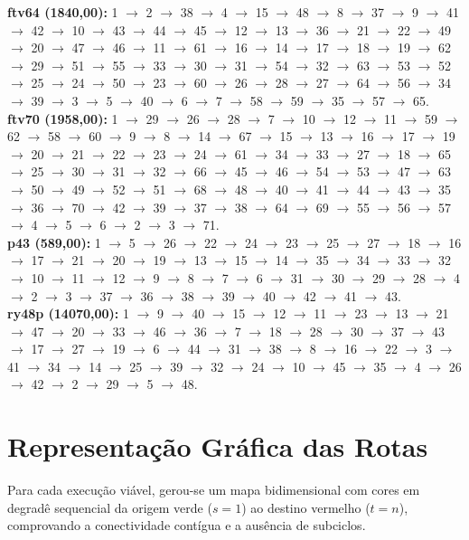 \documentclass[10pt,a4paper]{article}
\begin{document}
\textbf{ftv64 (1840,00):} 1 $\to$ 2 $\to$ 38 $\to$ 4 $\to$ 15 $\to$ 48 $\to$ 8 $\to$ 37 $\to$ 9 $\to$ 41 $\to$ 42 $\to$ 10 $\to$ 43 $\to$ 44 $\to$ 45 $\to$ 12 $\to$ 13 $\to$ 36 $\to$ 21 $\to$ 22 $\to$ 49 $\to$ 20 $\to$ 47 $\to$ 46 $\to$ 11 $\to$ 61 $\to$ 16 $\to$ 14 $\to$ 17 $\to$ 18 $\to$ 19 $\to$ 62 $\to$ 29 $\to$ 51 $\to$ 55 $\to$ 33 $\to$ 30 $\to$ 31 $\to$ 54 $\to$ 32 $\to$ 63 $\to$ 53 $\to$ 52 $\to$ 25 $\to$ 24 $\to$ 50 $\to$ 23 $\to$ 60 $\to$ 26 $\to$ 28 $\to$ 27 $\to$ 64 $\to$ 56 $\to$ 34 $\to$ 39 $\to$ 3 $\to$ 5 $\to$ 40 $\to$ 6 $\to$ 7 $\to$ 58 $\to$ 59 $\to$ 35 $\to$ 57 $\to$ 65. \\
\textbf{ftv70 (1958,00):} 1 $\to$ 29 $\to$ 26 $\to$ 28 $\to$ 7 $\to$ 10 $\to$ 12 $\to$ 11 $\to$ 59 $\to$ 62 $\to$ 58 $\to$ 60 $\to$ 9 $\to$ 8 $\to$ 14 $\to$ 67 $\to$ 15 $\to$ 13 $\to$ 16 $\to$ 17 $\to$ 19 $\to$ 20 $\to$ 21 $\to$ 22 $\to$ 23 $\to$ 24 $\to$ 61 $\to$ 34 $\to$ 33 $\to$ 27 $\to$ 18 $\to$ 65 $\to$ 25 $\to$ 30 $\to$ 31 $\to$ 32 $\to$ 66 $\to$ 45 $\to$ 46 $\to$ 54 $\to$ 53 $\to$ 47 $\to$ 63 $\to$ 50 $\to$ 49 $\to$ 52 $\to$ 51 $\to$ 68 $\to$ 48 $\to$ 40 $\to$ 41 $\to$ 44 $\to$ 43 $\to$ 35 $\to$ 36 $\to$ 70 $\to$ 42 $\to$ 39 $\to$ 37 $\to$ 38 $\to$ 64 $\to$ 69 $\to$ 55 $\to$ 56 $\to$ 57 $\to$ 4 $\to$ 5 $\to$ 6 $\to$ 2 $\to$ 3 $\to$ 71. \\
\textbf{p43 (589,00):} 1 $\to$ 5 $\to$ 26 $\to$ 22 $\to$ 24 $\to$ 23 $\to$ 25 $\to$ 27 $\to$ 18 $\to$ 16 $\to$ 17 $\to$ 21 $\to$ 20 $\to$ 19 $\to$ 13 $\to$ 15 $\to$ 14 $\to$ 35 $\to$ 34 $\to$ 33 $\to$ 32 $\to$ 10 $\to$ 11 $\to$ 12 $\to$ 9 $\to$ 8 $\to$ 7 $\to$ 6 $\to$ 31 $\to$ 30 $\to$ 29 $\to$ 28 $\to$ 4 $\to$ 2 $\to$ 3 $\to$ 37 $\to$ 36 $\to$ 38 $\to$ 39 $\to$ 40 $\to$ 42 $\to$ 41 $\to$ 43. \\
\textbf{ry48p (14070,00):} 1 $\to$ 9 $\to$ 40 $\to$ 15 $\to$ 12 $\to$ 11 $\to$ 23 $\to$ 13 $\to$ 21 $\to$ 47 $\to$ 20 $\to$ 33 $\to$ 46 $\to$ 36 $\to$ 7 $\to$ 18 $\to$ 28 $\to$ 30 $\to$ 37 $\to$ 43 $\to$ 17 $\to$ 27 $\to$ 19 $\to$ 6 $\to$ 44 $\to$ 31 $\to$ 38 $\to$ 8 $\to$ 16 $\to$ 22 $\to$ 3 $\to$ 41 $\to$ 34 $\to$ 14 $\to$ 25 $\to$ 39 $\to$ 32 $\to$ 24 $\to$ 10 $\to$ 45 $\to$ 35 $\to$ 4 $\to$ 26 $\to$ 42 $\to$ 2 $\to$ 29 $\to$ 5 $\to$ 48.
\normalsize

\section{Representação Gráfica das Rotas}
Para cada execução viável, gerou-se um mapa bidimensional com cores em degradê sequencial da origem verde ($s=1$) ao destino vermelho ($t=n$), comprovando a conectividade contígua e a ausência de subciclos.
\end{document}
